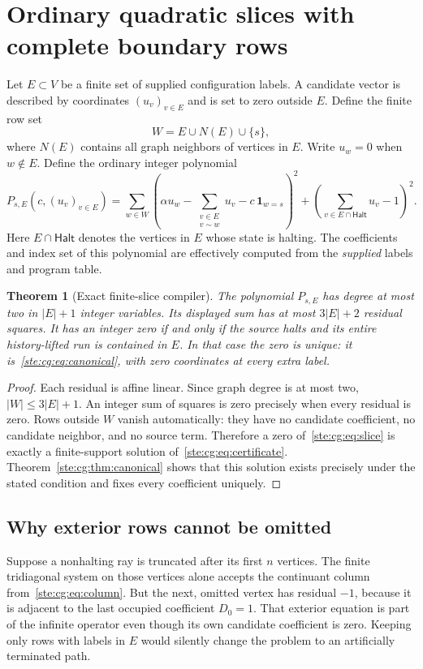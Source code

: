 \documentclass[11pt,letterpaper]{article}
\newtheorem{theorem}{Theorem}[section]
\theoremstyle{definition}
\theoremstyle{remark}
\newcommand{\Halt}{\mathsf{Halt}}
\begin{document}
\section{Ordinary quadratic slices with complete boundary rows}\label{ste:cg:sec:slices}
Let $E\subset V$ be a finite set of supplied configuration labels. A
candidate vector is described by coordinates $(u_v)_{v\in E}$ and is set
to zero outside $E$. Define the finite row set
\begin{equation}\label{ste:cg:eq:rowset}
 W=E\cup N(E)\cup\{s\},
\end{equation}
where $N(E)$ contains all graph neighbors of vertices in $E$. Write
$u_w=0$ when $w\notin E$. Define the ordinary integer polynomial
\begin{equation}\label{ste:cg:eq:slice}
 P_{s,E}(c,(u_v)_{v\in E})=
 \sum_{w\in W}
 \left(\alpha u_w-\sum_{\substack{v\in E\\v\sim w}}u_v
       -c\,\mathbf1_{w=s}\right)^2
 +\left(\sum_{v\in E\cap\Halt}u_v-1\right)^2.
\end{equation}
Here $E\cap\Halt$ denotes the vertices in $E$ whose state is halting.
The coefficients and index set of this polynomial are effectively computed
from the \emph{supplied} labels and program table.

\begin{theorem}[Exact finite-slice compiler]\label{ste:cg:thm:slice}
The polynomial $P_{s,E}$ has degree at most two in $|E|+1$ integer
variables. Its displayed sum has at most $3|E|+2$ residual squares.
It has an integer zero if and only if the source halts and its entire
history-lifted run is contained in $E$. In that case the zero is unique:
it is~\eqref{ste:cg:eq:canonical}, with zero coordinates at every extra label.
\end{theorem}
\begin{proof}
Each residual is affine linear. Since graph degree is at most two,
$|W|\le3|E|+1$. An integer sum of squares is zero precisely when every
residual is zero. Rows outside $W$ vanish automatically: they have no
candidate coefficient, no candidate neighbor, and no source term.
Therefore a zero of~\eqref{ste:cg:eq:slice} is exactly a finite-support solution
of~\eqref{ste:cg:eq:certificate}. Theorem~\ref{ste:cg:thm:canonical} shows that this
solution exists precisely under the stated condition and fixes every
coefficient uniquely.
\end{proof}

\subsection{Why exterior rows cannot be omitted}
Suppose a nonhalting ray is truncated after its first $n$ vertices. The
finite tridiagonal system on those vertices alone accepts the continuant
column from~\eqref{ste:cg:eq:column}. But the next, omitted vertex has residual
$-1$, because it is adjacent to the last occupied coefficient $D_0=1$.
That exterior equation is part of the infinite operator even though its
own candidate coefficient is zero. Keeping only rows with labels in $E$
would silently change the problem to an artificially terminated path.
\end{document}
